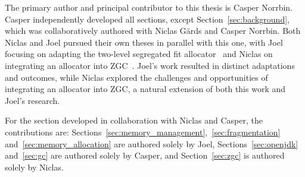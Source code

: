 The primary author and principal contributor to this thesis is Casper Norrbin. Casper independently developed all sections, except Section~\ref{sec:background}, which was collaboratively authored with Niclas Gärds and Casper Norrbin. Both Niclas and Joel pursued their own theses in parallel with this one, with Joel focusing on adapting the two-level segregated fit allocator~\cite{joel} and Niclas on integrating an allocator into ZGC~\cite{niclas}. Joel's work resulted in distinct adaptations and outcomes, while Niclas explored the challenges and opportunities of integrating an allocator into ZGC, a natural extension of both this work and Joel's research.

For the section developed in collaboration with Niclas and Casper, the contributions are: Sections~\ref{sec:memory_management},~\ref{sec:fragmentation} and~\ref{sec:memory_allocation} are authored solely by Joel, Sections~\ref{sec:openjdk} and~\ref{sec:gc} are authored solely by Casper, and Section~\ref{sec:zgc} is authored solely by Niclas.

